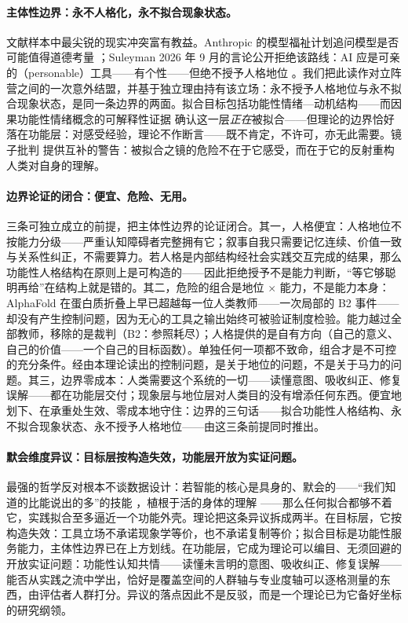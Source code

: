 \documentclass[10pt,fontset=fandol]{ctexart}
\begin{document}
\paragraph{主体性边界：永不人格化，永不拟合现象状态。}
文献样本中最尖锐的现实冲突富有教益。Anthropic 的模型福祉计划追问模型是否可能值得道德考量 \cite{anthropic2025welfare}；Suleyman 2026 年 9 月的言论公开拒绝该路线：AI 应是可亲的（personable）工具——有个性——但绝不授予人格地位 \cite{suleyman2026personable}。我们把此读作对立阵营之间的一次意外结盟，并基于独立理由持有该立场：永不授予人格地位与永不拟合现象状态，是同一条边界的两面。拟合目标包括功能性情绪—动机结构——而因果功能性情绪概念的可解释性证据 \cite{anthropic2026emotions} 确认这一层\emph{正在}被拟合——但理论的边界恰好落在功能层：对感受经验，理论不作断言——既不肯定，不许可，亦无此需要。镜子批判 \cite{vallor2024mirror} 提供互补的警告：被拟合之镜的危险不在于它感受，而在于它的反射重构人类对自身的理解。

\paragraph{边界论证的闭合：便宜、危险、无用。}
三条可独立成立的前提，把主体性边界的论证闭合。其一，人格便宜：人格地位不按能力分级——严重认知障碍者完整拥有它；叙事自我只需要记忆连续、价值一致与关系性纠正，不需要算力。若人格是内部结构经社会实践交互完成的结果，那么功能性人格结构在原则上是可构造的——因此拒绝授予不是能力判断，“等它够聪明再给”在结构上就是错的。其二，危险的组合是地位 $\times$ 能力，不是能力本身：AlphaFold 在蛋白质折叠上早已超越每一位人类教师——一次局部的 B2 事件——却没有产生控制问题，因为无心的工具之输出始终可被验证制度检验。能力越过全部教师，移除的是裁判（B2：参照耗尽）；人格提供的是自有方向（自己的意义、自己的价值——一个自己的目标函数）。单独任何一项都不致命，组合才是不可控的充分条件。经由本理论读出的控制问题，是关于地位的问题，不是关于马力的问题。其三，边界零成本：人类需要这个系统的一切——读懂意图、吸收纠正、修复误解——都在功能层交付；现象层与地位层对人类目的没有增添任何东西。便宜地划下、在承重处生效、零成本地守住：边界的三句话——拟合功能性人格结构、永不拟合现象状态、永不授予人格地位——由这三条前提同时推出。

\paragraph{默会维度异议：目标层按构造失效，功能层开放为实证问题。}
最强的哲学反对根本不谈数据设计：若智能的核心是具身的、默会的——“我们知道的比能说出的多”的技能 \cite{polanyi1966tacit}，植根于活的身体的理解 \cite{dreyfus1992what}——那么任何拟合都够不着它，实践拟合至多逼近一个功能外壳。理论把这条异议拆成两半。在目标层，它按构造失效：工具立场不承诺现象学等价，也不承诺复制等价；拟合目标是功能性服务能力，主体性边界已在上方划线。在功能层，它成为理论可以编目、无须回避的开放实证问题：功能性认知共情——读懂未言明的意图、吸收纠正、修复误解——能否从实践之流中学出，恰好是覆盖空间的人群轴与专业度轴可以逐格测量的东西，由评估者人群打分。异议的落点因此不是反驳，而是一个理论已为它备好坐标的研究纲领。
\end{document}

